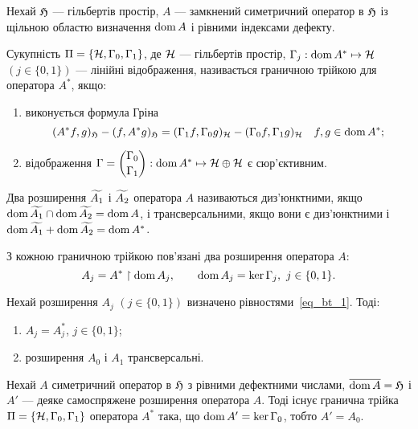 Нехай $\mathfrak{H}$ --- гільбертів простір, $A$ --- замкнений симетричний оператор в $\mathfrak{H}$ із щільною областю визначення $\operatorname{dom} A$ і рівними індексами дефекту. 

\begin{definition}
	Сукупність $\Pi = \{\mathcal{H}, \Gamma_0, \Gamma_1\}$, де $\mathcal{H}$ --- гільбертів простір, $\Gamma_j:\operatorname{dom}{A^*} \mapsto \mathcal{H}$ $(j\in \{0,1\})$ --- лінійні відображення, називається граничною трійкою для оператора $A^*$, якщо:
	\begin{enumerate}
		\item виконується формула Гріна
		\begin{equation}\label{eq-CS-Green}
			(A^*f,g)_{\mathfrak{H}} - (f,A^*g)_{\mathfrak{H}} = (\Gamma_1f,\Gamma_0g)_{\mathcal{H}} - (\Gamma_0f,\Gamma_1g)_{\mathcal{H}} \quad f,g \in \operatorname{dom} A^*;
		\end{equation}
		\item  відображення $\Gamma = \dbinom{\Gamma_0}{\Gamma_1}: \operatorname{dom} A^* \mapsto \mathcal{H}\oplus\mathcal{H}$ є сюр'єктивним.
	\end{enumerate}
\end{definition}

\begin{definition}
	Два розширення $\widetilde {A_1}$ і $\widetilde {A_2}$ оператора $A$ називаються диз'юнктними, якщо $\operatorname{dom} \widetilde {A_1} \cap \operatorname{dom} \widetilde {A_2} = \operatorname{dom} A$, і трансверсальними, якщо вони є диз'юнктними і $\operatorname{dom} \widetilde {A_1} + \operatorname{dom} \widetilde {A_2} = \operatorname{dom} A^*$.
\end{definition}

З кожною граничною трійкою пов'язані два розширення оператора $A$: 
\begin{equation}\label{eq_bt_1}
	A_j = A^* \upharpoonright \operatorname{dom} A_j, \qquad \operatorname{dom} A_j = \ker \Gamma_j,\  j\in \{0,1\}.
\end{equation}

\begin{proposition}
	Нехай розширення $A_j$ $(j\in \{0,1\})$ визначено рівностями~\eqref{eq_bt_1}. Тоді:
	\begin{enumerate}
		\item $A_j = A^*_j$, $j\in \{0,1\}$;
		\item розширення $A_0$ і $A_1$ трансверсальні.
	\end{enumerate}
\end{proposition}

\begin{proposition}
	Нехай $A$ симетричний оператор в $\mathfrak{H}$ з рівними дефектними числами, $\overline{\operatorname{dom} A} = \mathfrak{H}$ і $A'$ --- деяке самоспряжене розширення оператора $A$. Тоді існує гранична трійка $\Pi = \{\mathcal{H}, \Gamma_0, \Gamma_1\}$ оператора $A^*$ така, що $\operatorname{dom} A' = \ker \Gamma_0$, тобто $A' = A_0$.
\end{proposition}

